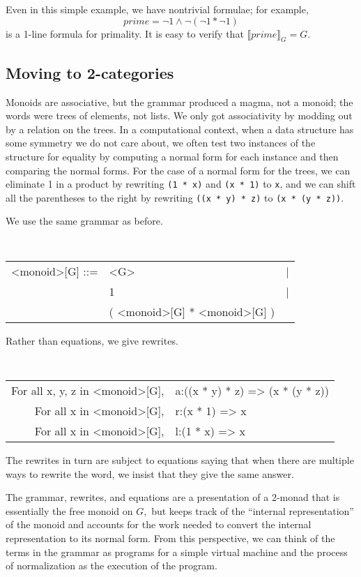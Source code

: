 \documentclass{article}
\newcommand{\interp}[1]{\llbracket #1 \rrbracket}
\begin{document}
Even in this simple example, we have nontrivial formulae; for example,
\[ prime = \neg 1 \land \neg(\neg 1 * \neg 1) \]
is a 1-line formula for primality.  It is easy to verify that $\interp{prime}_G = G.$

\subsection{Moving to 2-categories}

Monoids are associative, but the grammar produced a magma, not a monoid; the words were trees of elements, not lists.  We only got associativity by modding out by a relation on the trees.  In a computational context, when a data structure has some symmetry we do not care about, we often test two instances of the structure for equality by computing a normal form for each instance and then comparing the normal forms.  For the case of a normal form for the trees, we can eliminate 1 in a product by rewriting {\tt (1 * x)} and {\tt (x * 1)} to {\tt x}, and we can shift all the parentheses to the right by rewriting {\tt ((x * y) * z)} to {\tt (x * (y * z))}.  

We use the same grammar as before.
\begin{center}
  \tt
  \begin{tabular}{rll}
    <monoid>[G] ::= & <G> &|\\
    & 1 &|\\
    & ( <monoid>[G] * <monoid>[G] )
  \end{tabular}
\end{center}
Rather than equations, we give rewrites.
\begin{center}
  \tt \small
  \begin{tabular}{rl}
    For all x, y, z in <monoid>[G], & a:((x * y) * z) => (x * (y * z))\\
    For all x in <monoid>[G], & r:(x * 1) => x\\
    For all x in <monoid>[G], & l:(1 * x) => x
  \end{tabular}
\end{center}
The rewrites in turn are subject to equations saying that when there are multiple ways to rewrite the word, we insist that they give the same answer.

The grammar, rewrites, and equations are a presentation of a 2-monad that is essentially the free monoid on $G,$ but keeps track of the ``internal representation'' of the monoid and accounts for the work needed to convert the internal representation to its normal form.  From this perspective, we can think of the terms in the grammar as programs for a simple virtual machine and the process of normalization as the execution of the program.
\end{document}
